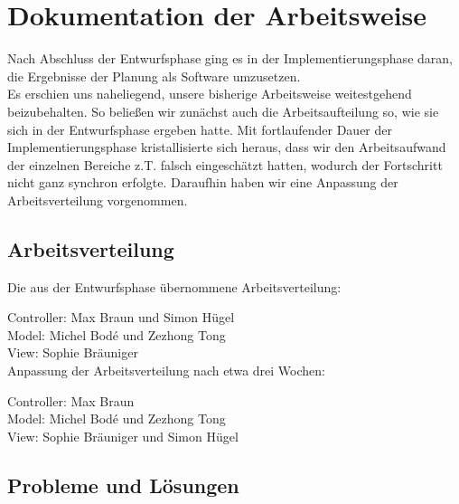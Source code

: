 \section{Dokumentation der Arbeitsweise}

Nach Abschluss der Entwurfsphase ging es in der Implementierungsphase daran, die Ergebnisse der Planung als Software umzusetzen.\\
Es erschien uns naheliegend, unsere bisherige Arbeitsweise weitestgehend beizubehalten. So beließen wir zunächst auch die Arbeitsaufteilung so, wie sie sich in der Entwurfsphase ergeben hatte. Mit fortlaufender Dauer der Implementierungsphase kristallisierte sich heraus, dass wir den Arbeitsaufwand der einzelnen Bereiche z.T. falsch eingeschätzt hatten, wodurch der Fortschritt nicht ganz synchron erfolgte. Daraufhin haben wir eine Anpassung der Arbeitsverteilung vorgenommen.

\subsection{Arbeitsverteilung}

Die aus der Entwurfsphase übernommene Arbeitsverteilung:

Controller: Max Braun und Simon Hügel\\
Model: Michel Bodé und Zezhong Tong\\
View: Sophie Bräuniger\\

Anpassung der Arbeitsverteilung nach etwa drei Wochen:

Controller: Max Braun\\
Model: Michel Bodé und Zezhong Tong\\
View: Sophie Bräuniger und Simon Hügel\\

\subsection{Probleme und Lösungen}

